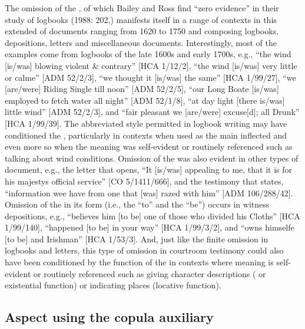 The omission of the , of which Bailey and Ross find “zero evidence” in their study of  logbooks (1988: 202,) manifests itself in a range of contexts in this extended  of documents ranging from 1620 to 1750 and composing logbooks, depositions, letters and miscellaneous documents. Interestingly, most of the examples come from logbooks of the late 1600s and early 1700s, e.g., “the wind [is/was] blowing violent \& contrary” [HCA 1/12/2], “the wind [is/was] very little or calme” [ADM 52/2/3], “we thought it [is/was] the same” [HCA 1/99/27], “we [are/were] Riding Single till noon” [ADM 52/2/5], “our Long Boate [is/was] employed to fetch water all night” [ADM 52/1/8], “at day light [there is/was] little wind” [ADM 52/2/3], and “fair pleasant we [are/were] excuse[d]; all Drunk” [HCA 1/99/39]. The abbreviated style permitted in logbook writing may have conditioned the , particularly in  contexts when used as the main inflected  and even more so when the meaning was self-evident or routinely referenced such as talking about wind conditions.  Omission of the  was also evident in other types of document, e.g., the letter that opens, “It [is/was] appealing to me, that it is for his majestys official service” [CO 5/1411/666], and the testimony that states, “information wee have from one that [was] razed with him” [ADM 106/288/42]. Omission of the  in its  form (i.e., the  “to” and the  “be”) occurs in witness depositions, e.g., “believes him [to be] one of those who divided his Cloths” [HCA 1/99/140], “happened [to be] in your way” [HCA 1/99/3/2], and “owns himselfe [to be] and Irishman” [HCA 1/53/3]. And, just like the finite omission in logbooks and letters, this type of  omission in courtroom testimony could also have been conditioned by the function of the  in contexts where meaning is self-evident or routinely referenced such as giving character descriptions ( or existential  function) or indicating places (locative  function).

\subsection{{Aspect using the copula auxiliary}}\label{sec:6.3.3}

